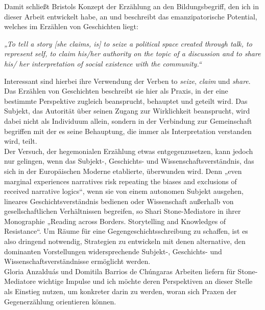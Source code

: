   \noindent Damit schließt Bristols Konzept der Erzählung an den Bildungsbegriff, den ich in dieser Arbeit entwickelt habe, an und beschreibt das emanzipatorische
  Potential, welches im Erzählen von Geschichten liegt:
  \begin{myenv}
\textit{„To tell a story [she claims, is] to seize a political space
  created through talk, to represent self, to claim his/her authority on
  the topic of a discussion and to share his/ her interpretation of social
existence with the community.“\footnotemark {}} 
\end{myenv}
Interessant sind hierbei ihre Verwendung der Verben to \textit{seize},
\textit{claim} und \textit{share}.
Das Erzählen von Geschichten beschreibt sie hier als Praxis, in der eine
bestimmte Perspektive zugleich beansprucht, behauptet und geteilt wird. Das
Subjekt, das Autorität über seinen Zugang zur Wirklichkeit beansprucht, wird
dabei nicht als Individuum allein, sondern in der Verbindung zur Gemeinschaft
begriffen mit der es seine Behauptung, die immer als Interpretation verstanden wird, teilt.\\

\noindent Der Versuch, der hegemonialen Erzählung etwas entgegenzusetzen, kann jedoch nur
gelingen, wenn das Subjekt-, Geschichts- und Wissenschaftsverständnis, das sich
in der Europäischen Moderne etablierte, überwunden wird. Denn „even marginal
experiences narratives risk repeating the biases and exclusions of received
narrative logics“\footnotemark {}, wenn sie von einem autonomen Subjekt ausgehen, lineares
Geschichtsverständnis bedienen oder Wissenschaft außerhalb von
gesellschaftlichen Verhältnissen begreifen, so Shari Stone-Mediatore in ihrer
Monographie „Reading across Borders. Storytelling and Knowledges of
Resistance“\footnotemark {}. Um Räume für eine Gegengeschichtsschreibung zu schaffen, ist es
also dringend notwendig, Strategien zu entwickeln mit denen alternative, den
dominanten Vorstellungen widersprechende Subjekt-, Geschichts- und
Wissenschaftsverständnisse ermöglicht werden.\\
Gloria Anzalduás und Domitila Barrios de Chúngaras Arbeiten liefern für
Stone-Mediatore wichtige Impulse und ich möchte deren Perspektiven an dieser
Stelle als Einstieg nutzen, um konkreter darin zu werden, woran sich Praxen der
Gegenerzählung orientieren können.\\

